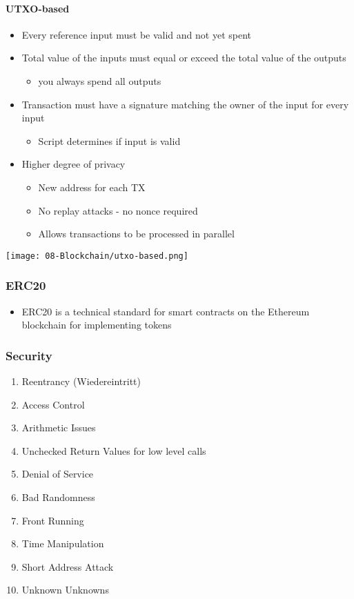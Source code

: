 \paragraph{UTXO-based}
\begin{itemize}
    \item Every reference input must be valid and not yet spent
    \item Total value of the inputs must equal or exceed the total value of the outputs
    \begin{itemize}
        \item you always spend all outputs
    \end{itemize}
    \item Transaction must have a signature matching the owner of the input for every input
    \begin{itemize}
        \item Script determines if input is valid
    \end{itemize}
    \item Higher degree of privacy
    \begin{itemize}
        \item New address for each TX
        \item No replay attacks - no nonce required
        \item Allows transactions to be processed in parallel
    \end{itemize}
\end{itemize}
\begin{center}    
    \texttt{[image: 08-Blockchain/utxo-based.png]}
\end{center}

\subsubsection{ERC20}
\begin{itemize}
    \item  ERC20 is a technical standard for smart contracts on the Ethereum blockchain for implementing tokens
\end{itemize}

\subsubsection{Security}
\begin{enumerate}
    \item Reentrancy (Wiedereintritt)
    \item Access Control
    \item Arithmetic Issues
    \item Unchecked Return Values for low level calls
    \item Denial of Service
    \item Bad Randomness
    \item Front Running
    \item Time Manipulation
    \item Short Address Attack
    \item Unknown Unknowns
\end{enumerate}


